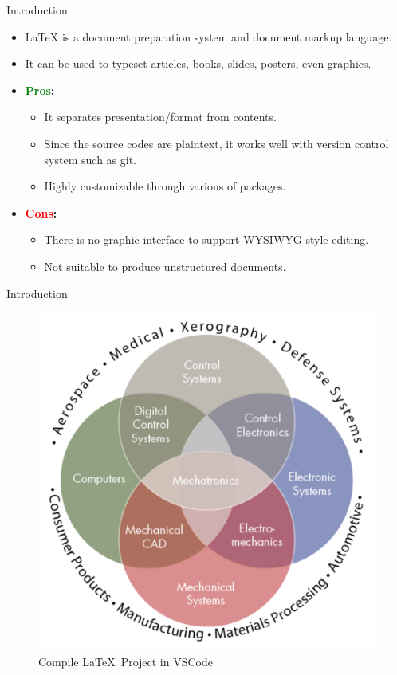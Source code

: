 \documentclass[xcolor={dvipsnames},aspectratio=169,10pt]{beamer}
\begin{document}
\begin{frame}{Introduction}
  \begin{itemize}
    \item \alert{\LaTeX{}} is a document preparation system and document markup language.
    \item It can be used to typeset articles, books, slides, posters, even graphics.
    \item \textbf{\textcolor{Green}{Pros}:}
          \begin{itemize}
            \item It separates presentation/format from contents.
            \item Since the source codes are plaintext, it works well with version control system such as git.
            \item Highly customizable through various of packages.
          \end{itemize}
    \item \textbf{\textcolor{Red}{Cons}:}
          \begin{itemize}
            \item There is no graphic interface to support WYSIWYG style editing.
            \item Not suitable to produce unstructured documents.
          \end{itemize}
  \end{itemize}
\end{frame}

\begin{frame}{Introduction}


      \begin{figure}
        \centering
        \includegraphics[scale=0.2]{./figs/multidisciplinary-engigneering/versions/drawing.png}
        \caption{Compile \LaTeX~Project in VSCode}
      \end{figure}
 

\end{frame}
\end{document}
